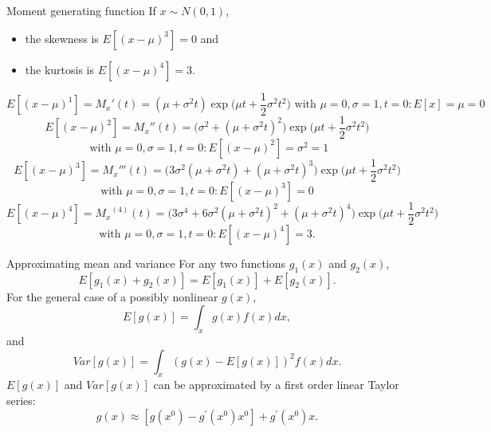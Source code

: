 \documentclass[11pt,table]{beamer}
\begin{document}
\begin{frame}{Moment generating function}
\small
If $x\sim N(0,1)$, 
\begin{itemize}
	\item the skewness is $E[(x - \mu)^{3}]=0$ and
	\item the kurtosis is $E[(x - \mu)^{4}]=3$.
\end{itemize}
\scriptsize
\begin{example}
\vspace{-5mm}
$$E[(x - \mu)^{1}]={M_x}'(t) =(\mu +  \sigma^2 t)\exp \bigg(\mu t + \dfrac 1 2 \sigma^2 t^2\bigg) \text{ with } \mu=0, \sigma=1, t=0: E[x]=\mu=0$$
$$E[(x - \mu)^{2}]={M_x}''(t) =  \bigg(\sigma^2 + (\mu + \sigma^2 t)^2 \bigg)  \exp \bigg(\mu t + \dfrac 1 2 \sigma^2 t^2\bigg)$$ $$\text{ with } \mu=0, \sigma=1, t=0: E[(x - \mu)^{2}]=\sigma^2=1$$
$$E[(x - \mu)^{3}]={M_x}'''(t) =\bigg(3 \sigma^2 (\mu + \sigma^2 t) + (\mu + \sigma^2 t)^3\bigg)  \exp\bigg(\mu t + \dfrac 1 2 \sigma^2 t^2\bigg)$$
$$\text{with } \mu=0, \sigma=1, t=0: E[(x - \mu)^{3}]= 0$$
$$E[(x - \mu)^{4}]={M_x}^{(4)} (t) = \bigg(3 \sigma^4 + 6 \sigma^2 (\mu + \sigma^2 t)^2 + (\mu + \sigma^2 t)^4\bigg) \exp\bigg(\mu t + \dfrac 1 2 \sigma^2 t^2\bigg)$$
$$\text{with } \mu=0, \sigma=1, t=0: E[(x - \mu)^{4}]=3.$$
\end{example}
\end{frame}

\begin{frame}{Approximating mean and variance}
For any two functions $g_{1}(x)$ and $g_{2}(x)$,
 \begin{equation}
    E[g_{1}(x) + g_{2}(x)] = E[g_{1}(x)] + E[g_{2}(x)].
 \end{equation}
 For the general case of a possibly nonlinear $g(x)$,
 {\begin{equation}
    E[g(x)] =\int_{x}g(x)f(x)dx,
 \end{equation}
 and
 \begin{equation}
    Var[g(x)] =\int_{x}\left(g(x) - E [g(x)]\right)^{2}f(x)dx.
 \end{equation}}
$E[g(x)]$ and $Var[g(x)]$ can be approximated by a first order linear Taylor series:
\begin{equation}\label{eq5}
    g(x)\approx [g(x^{0})-g^{\prime}(x^{0})x^{0}]+g^{\prime}(x^{0})x.
\end{equation}
\end{frame}
\end{document}

